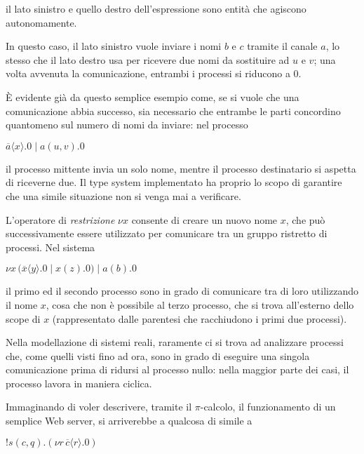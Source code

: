 il lato sinistro e quello destro dell'espressione sono entit\`a che agiscono
autonomamente.

In questo caso, il lato sinistro vuole inviare i nomi $b$ e $c$ tramite il
canale $a$, lo stesso che il lato destro usa per ricevere due nomi da
sostituire ad $u$ e $v$; una volta avvenuta la comunicazione, entrambi i
processi si riducono a $0$.

\`E evidente gi\`a da questo semplice esempio come, se si vuole che una
comunicazione abbia successo, sia necessario che entrambe le parti
concordino quantomeno sul numero di nomi da inviare: nel processo

\begin{pilisting}
$
    \overline{a}\langle x\rangle.0 \; | \;
    a(u,v).0
$
\end{pilisting}

il processo mittente invia un solo nome, mentre il processo destinatario
si aspetta di riceverne due. Il type system implementato ha proprio lo
scopo di garantire che una simile situazione non si venga mai a verificare.

L'operatore di \emph{restrizione} $\nu x$ consente di creare un nuovo nome
$x$, che pu\`o successivamente essere utilizzato per comunicare tra un
gruppo ristretto di processi. Nel sistema

\begin{pilisting}
$
    \nu x \, (
      \overline{x}\langle y\rangle.0 \; | \;
      x(z).0
    ) \; | \;
    a(b).0
$
\end{pilisting}

il primo ed il secondo processo sono in grado di comunicare tra di loro
utilizzando il nome $x$, cosa che non \`e possibile al terzo processo, che
si trova all'esterno dello scope di $x$ (rappresentato dalle parentesi che
racchiudono i primi due processi).

Nella modellazione di sistemi reali, raramente ci si trova ad analizzare
processi che, come quelli visti fino ad ora, sono in grado di eseguire una
singola comunicazione prima di ridursi al processo nullo: nella maggior
parte dei casi, il processo lavora in maniera ciclica.

Immaginando di voler descrivere, tramite il $\pi$-calcolo, il funzionamento
di un semplice Web server, si arriverebbe a qualcosa di simile a

\begin{pilisting}
$
    !s(c,q).(\nu r \, \overline{c}\langle r\rangle.0)
$
\end{pilisting}

